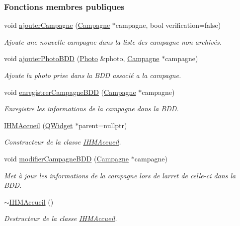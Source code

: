 \subsubsection*{Fonctions membres publiques}
\begin{DoxyCompactItemize}
\item 
void \hyperlink{class_i_h_m_accueil_a3087ce7a78561c79ce3148761750dd1d}{ajouter\+Campagne} (\hyperlink{class_campagne}{Campagne} $\ast$campagne, bool verification=false)
\begin{DoxyCompactList}\small\item\em Ajoute une nouvelle campagne dans la liste des campagne non archivés. \end{DoxyCompactList}\item 
void \hyperlink{class_i_h_m_accueil_aa27c7334efe44c8c4cd582df6581fdff}{ajouter\+Photo\+B\+DD} (\hyperlink{struct_photo}{Photo} \&photo, \hyperlink{class_campagne}{Campagne} $\ast$campagne)
\begin{DoxyCompactList}\small\item\em Ajoute la photo prise dans la B\+DD associé a la campagne. \end{DoxyCompactList}\item 
void \hyperlink{class_i_h_m_accueil_a5ab04fc3fa87817bec130f377d563b75}{enregistrer\+Campagne\+B\+DD} (\hyperlink{class_campagne}{Campagne} $\ast$campagne)
\begin{DoxyCompactList}\small\item\em Enregistre les informations de la campagne dans la B\+DD. \end{DoxyCompactList}\item 
\hyperlink{class_i_h_m_accueil_a66cf4d5655e3132c1d313b76f3905e52}{I\+H\+M\+Accueil} (\hyperlink{class_q_widget}{Q\+Widget} $\ast$parent=nullptr)
\begin{DoxyCompactList}\small\item\em Constructeur de la classe \hyperlink{class_i_h_m_accueil}{I\+H\+M\+Accueil}. \end{DoxyCompactList}\item 
void \hyperlink{class_i_h_m_accueil_a7f1e5f71843a99cb44e3efb7191a6d07}{modifier\+Campagne\+B\+DD} (\hyperlink{class_campagne}{Campagne} $\ast$campagne)
\begin{DoxyCompactList}\small\item\em Met à jour les informations de la campagne lors de l\textquotesingle{}arret de celle-\/ci dans la B\+DD. \end{DoxyCompactList}\item 
\hyperlink{class_i_h_m_accueil_a5ea3926747dada8b9677ab9a33c03139}{$\sim$\+I\+H\+M\+Accueil} ()
\begin{DoxyCompactList}\small\item\em Destructeur de la classe \hyperlink{class_i_h_m_accueil}{I\+H\+M\+Accueil}. \end{DoxyCompactList}\end{DoxyCompactItemize}
